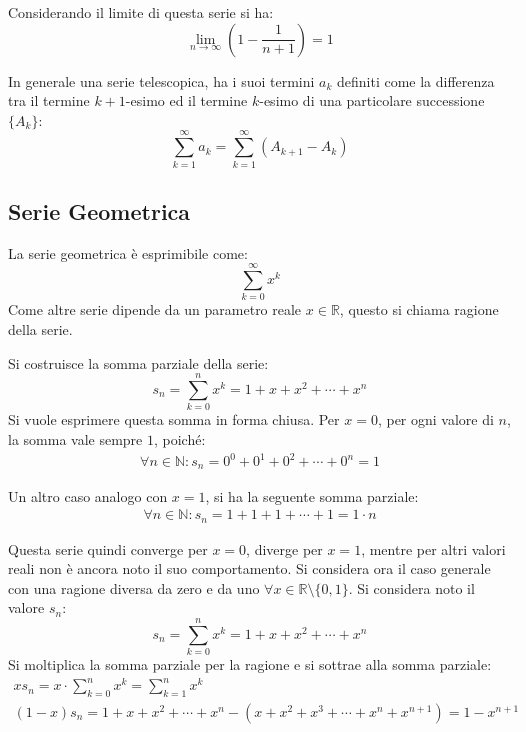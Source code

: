 \documentclass{article}
\numberwithin{equation}{subsection}
\begin{document}
Considerando il limite di questa serie si ha:
\begin{equation*}
    \lim_{n\to\infty}\left(1-\displaystyle\frac{1}{n+1}\right)=1
\end{equation*}

In generale una serie telescopica, ha i suoi termini $a_k$ definiti come la differenza tra il termine $k+1$-esimo ed il termine $k$-esimo di una particolare successione $\{A_k\}$:
\begin{equation*}
    \displaystyle\sum_{k=1}^\infty a_k=\sum_{k=1}^\infty\left(A_{k+1}-A_{k}\right)
\end{equation*} 

\subsection{Serie Geometrica}

La serie geometrica è esprimibile come:
\begin{equation*}
    \displaystyle\sum_{k=0}^\infty x^k
\end{equation*}
Come altre serie dipende da un parametro reale $x\in\mathbb{R}$, questo si chiama ragione della serie. 

Si costruisce la somma parziale della serie:
\begin{equation*}
    s_n=\displaystyle\sum_{k=0}^n x^k=1+x+x^2+\cdots+x^n    
\end{equation*}
Si vuole esprimere questa somma in forma chiusa. Per $x=0$, per ogni valore di $n$, la somma vale sempre $1$, poiché:
\begin{gather*}
    \forall n\in\mathbb{N}: s_n=0^0+0^1+0^2+\cdots+0^n=1
\end{gather*}

Un altro caso analogo con $x=1$, si ha la seguente somma parziale:
\begin{gather*}
    \forall n\in\mathbb{N}: s_n=1+1+1+\cdots+1=1\cdot n
\end{gather*}

Questa serie quindi converge per $x=0$, diverge per $x=1$, mentre per altri valori reali non è ancora noto il suo comportamento. 
Si considera ora il caso generale con una ragione diversa da zero e da uno $\forall x\in\mathbb{R}\setminus\{0,1\}$. 
Si considera noto il valore $s_n$:
\begin{equation*}
    s_n=\displaystyle\sum_{k=0}^n x^k=1+x+x^2+\cdots+x^n    
\end{equation*}
Si moltiplica la somma parziale per la ragione e si sottrae alla somma parziale:
\begin{gather*}
    xs_n=x\cdot\displaystyle\sum_{k=0}^n x^k=\sum_{k=1}^nx^k\\
    (1-x)s_n=1+x+x^2+\cdots+x^n-\left(x+x^2+x^3+\cdots+x^n+x^{n+1}\right)=1-x^{n+1}
\end{gather*}
\end{document}
